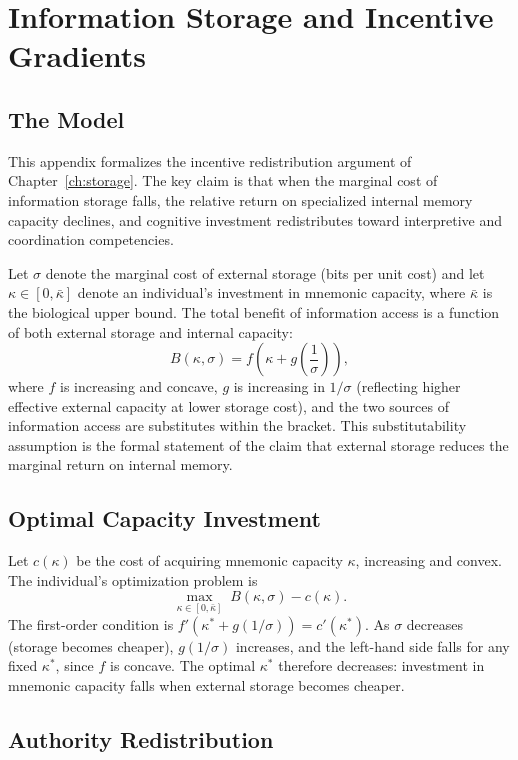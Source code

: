 \documentclass[12pt, oneside]{book}
\theoremstyle{plain}
\theoremstyle{definition}
\theoremstyle{remark}
\theoremstyle{definition}
\begin{document}
\chapter{Information Storage and Incentive Gradients}
\label{app:storage}

\section{The Model}

This appendix formalizes the incentive redistribution argument of Chapter~\ref{ch:storage}.
The key claim is that when the marginal cost of information storage falls, the
relative return on specialized internal memory capacity declines, and cognitive
investment redistributes toward interpretive and coordination competencies.

Let $\sigma$ denote the marginal cost of external storage (bits per unit cost) and
let $\kappa \in [0, \bar{\kappa}]$ denote an individual's investment in mnemonic
capacity, where $\bar{\kappa}$ is the biological upper bound. The total benefit of
information access is a function of both external storage and internal capacity:
\[
B(\kappa, \sigma) = f\!\left(\kappa + g\!\left(\frac{1}{\sigma}\right)\right),
\]
where $f$ is increasing and concave, $g$ is increasing in $1/\sigma$ (reflecting
higher effective external capacity at lower storage cost), and the two sources of
information access are substitutes within the bracket. This substitutability
assumption is the formal statement of the claim that external storage reduces the
marginal return on internal memory.

\section{Optimal Capacity Investment}

Let $c(\kappa)$ be the cost of acquiring mnemonic capacity $\kappa$, increasing and
convex. The individual's optimization problem is
\[
\max_{\kappa \in [0,\bar{\kappa}]} \; B(\kappa, \sigma) - c(\kappa).
\]
The first-order condition is $f'\!\left(\kappa^* + g(1/\sigma)\right) = c'(\kappa^*)$.
As $\sigma$ decreases (storage becomes cheaper), $g(1/\sigma)$ increases, and the
left-hand side falls for any fixed $\kappa^*$, since $f$ is concave. The optimal
$\kappa^*$ therefore decreases: investment in mnemonic capacity falls when external
storage becomes cheaper.

\section{Authority Redistribution}
\end{document}
